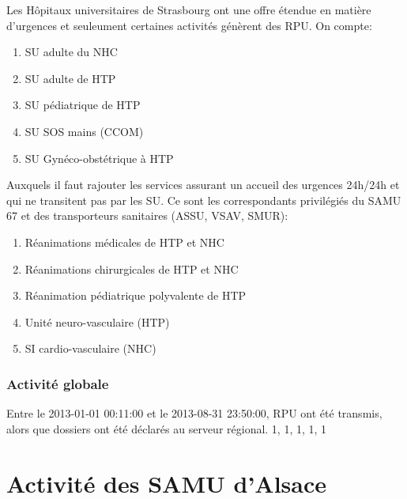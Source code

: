 \documentclass[12pt,english,french,twoside]{report}\usepackage[]{graphicx}\usepackage[]{color}
\begin{document}
Les Hôpitaux universitaires de Strasbourg ont une offre étendue en matière d'urgences et seuleument certaines activités génèrent des RPU.
On compte:
\begin{enumerate}
  \item SU adulte du NHC
  \item SU adulte de HTP
  \item SU pédiatrique de HTP
  \item SU SOS mains (CCOM)
  \item SU Gynéco-obstétrique à HTP
\end{enumerate}
Auxquels il faut rajouter les services assurant un accueil des urgences 24h/24h et qui ne transitent pas par les SU. Ce sont les correspondants privilégiés du SAMU 67 et des transporteurs sanitaires (ASSU, VSAV, SMUR):
\begin{enumerate}
  \item Réanimations médicales de HTP et NHC
  \item Réanimations chirurgicales de HTP et NHC
  \item Réanimation pédiatrique polyvalente de HTP
  \item Unité neuro-vasculaire (HTP)
  \item SI cardio-vasculaire (NHC)
\end{enumerate}

\section{Activité globale}




Entre le 2013-01-01 00:11:00 et le 2013-08-31 23:50:00,  RPU ont été transmis, alors que  dossiers ont été déclarés au serveur régional. 
1, 1, 1, 1, 1



\part{Activité des SAMU d'Alsace}


\end{document}
